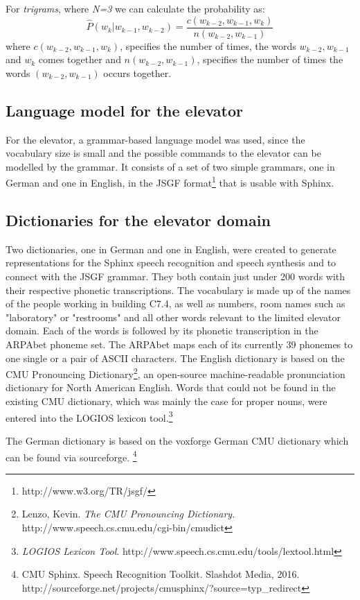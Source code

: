 \documentclass[a4paper, 12pt]{article}
\begin{document}
For \textit{trigrams}, where \textit{N=3} we can calculate the probability as:
\begin{equation}
  \hat{P}(w_k | w_{k-1},w_{k-2}) = \frac{c(w_{k-2},w_{k-1},w_k)}{n(w_{k-2},w_{k-1})}
\end{equation}
where $c(w_{k-2},w_{k-1},w_k)$, specifies the number of times, the words $w_{k-2},w_{k-1}$ and $w_k$ comes together and $n(w_{k-2},w_{k-1})$, specifies the number of times the words $(w_{k-2},w_{k-1})$ occurs together.

\subsection{Language model for the elevator}
For the elevator, a grammar-based language model was used, since the vocabulary size is small and the possible commands to the elevator can be modelled by the grammar.
It consists of a set of two simple grammars, one in German and one in English, in the JSGF format\footnote{http://www.w3.org/TR/jsgf/} that is usable with Sphinx.


\subsection{Dictionaries for the elevator domain}\label{dicts}
Two dictionaries, one in German and one in English, were created to generate representations for the Sphinx speech recognition and speech synthesis and to connect with the JSGF grammar.
They both contain just under 200 words with their respective phonetic transcriptions.
The vocabulary is made up of the names of the people working in building C7.4, as well as numbers, room names such as "laboratory" or "restrooms" and all other words relevant to the limited elevator domain.
Each of the words is followed by its phonetic transcription in the ARPAbet phoneme set.
The ARPAbet maps each of its currently 39 phonemes to one single or a pair of ASCII characters.
The English dictionary is based on the CMU Pronouncing Dictionary\footnote{Lenzo, Kevin. \textit{The CMU Pronouncing Dictionary.} http://www.speech.cs.cmu.edu/cgi-bin/cmudict}, an open-source  machine-readable pronunciation dictionary for North American English.
Words that could not be found in the existing CMU dictionary, which was mainly the case for proper nouns, were entered into the LOGIOS lexicon tool.\footnote{\textit{LOGIOS Lexicon Tool}. http://www.speech.cs.cmu.edu/tools/lextool.html}


The German dictionary is based on the voxforge German CMU dictionary which can be found via sourceforge.%
\footnote{CMU Sphinx. Speech Recognition Toolkit. Slashdot Media, 2016. http://sourceforge.net/projects/cmusphinx/?source=typ\_redirect}
\end{document}

